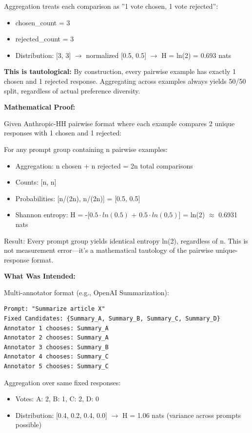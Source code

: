 Aggregation treats each comparison as ''1 vote chosen, 1 vote rejected'':
\begin{itemize}
\item chosen\_count = 3
\item rejected\_count = 3
\item Distribution: [3, 3] $\rightarrow$ normalized [0.5, 0.5] $\rightarrow$ H = ln(2) = 0.693 nats
\end{itemize}

\textbf{This is tautological:} By construction, every pairwise example has exactly 1 chosen and 1 rejected response. Aggregating across examples always yields 50/50 split, regardless of actual preference diversity.

\textbf{Mathematical Proof:}

Given Anthropic-HH pairwise format where each example compares 2 unique responses with 1 chosen and 1 rejected:

For any prompt group containing n pairwise examples:
\begin{itemize}
\item Aggregation: n chosen + n rejected = 2n total comparisons
\item Counts: [n, n]
\item Probabilities: [n/(2n), n/(2n)] = [0.5, 0.5]
\item Shannon entropy: H = -[0.$5\cdot ln(0.5)$ + 0.$5\cdot ln(0.5)]$ = ln(2) $\approx$ 0.6931 nats
\end{itemize}

Result: Every prompt group yields identical entropy ln(2), regardless of n. This is not measurement error---it's a mathematical tautology of the pairwise unique-response format.

\textbf{What Was Intended:}

Multi-annotator format (e.g., OpenAI Summarization):
\begin{verbatim}
Prompt: "Summarize article X"
Fixed Candidates: {Summary_A, Summary_B, Summary_C, Summary_D}
Annotator 1 chooses: Summary_A
Annotator 2 chooses: Summary_A
Annotator 3 chooses: Summary_B
Annotator 4 chooses: Summary_C
Annotator 5 chooses: Summary_C
\end{verbatim}

Aggregation over same fixed responses:
\begin{itemize}
\item Votes: {A: 2, B: 1, C: 2, D: 0}
\item Distribution: [0.4, 0.2, 0.4, 0.0] $\rightarrow$ H = 1.06 nats (variance across prompts possible)
\end{itemize}

